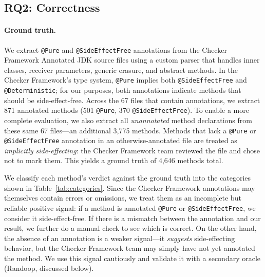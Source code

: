 \subsection{RQ2: Correctness}


\paragraph{Ground truth.}
We extract \texttt{@Pure} and \texttt{@SideEffectFree} annotations from the Checker Framework Annotated JDK source files using a custom parser that handles inner classes, receiver parameters, generic erasure, and abstract methods.
In the Checker Framework's type system, \texttt{@Pure} implies both \texttt{@SideEffectFree} and \texttt{@Deterministic}; for our purposes, both annotations indicate methods that should be side-effect-free.
Across the 67 files that contain annotations, we extract 871 annotated methods (501 \texttt{@Pure}, 370 \texttt{@SideEffectFree}).
To enable a more complete evaluation, we also extract all \emph{unannotated} method declarations from these same 67 files---an additional 3,775 methods.
Methods that lack a \texttt{@Pure} or \texttt{@SideEffectFree} annotation in an otherwise-annotated file are treated as \emph{implicitly side-effecting}: the Checker Framework team reviewed the file and chose not to mark them.
This yields a ground truth of 4,646 methods total.

We classify each method's verdict against the ground truth into the categories shown in Table~\ref{tab:categories}.
Since the Checker Framework annotations may themselves contain errors or omissions,
we treat them as an incomplete but reliable positive signal: if a method is annotated \texttt{@Pure} or \texttt{@SideEffectFree}, we consider it side-effect-free.
If there is a mismatch between the annotation and our result, we further do a manual check to see which is correct.
On the other hand, the absence of an annotation is a weaker signal---it \emph{suggests} side-effecting behavior, but the Checker Framework team may simply have not yet annotated the method.
We use this signal cautiously and validate it with a secondary oracle (Randoop, discussed below).

